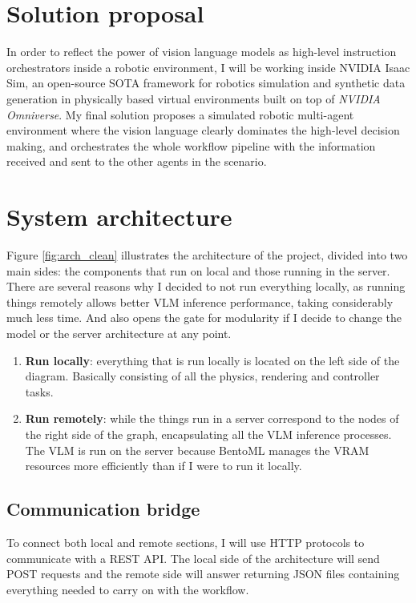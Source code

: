\section{Solution proposal}
In order to reflect the power of vision language models as high-level instruction orchestrators inside a robotic environment, I will be working inside NVIDIA Isaac Sim, an open-source SOTA framework for robotics simulation and synthetic data generation in physically based virtual environments built on top of \textit{NVIDIA Omniverse}. My final solution proposes a simulated robotic multi-agent environment where the vision language clearly dominates the high-level decision making, and orchestrates the whole workflow pipeline with the information received and sent to the other agents in the scenario. 

\section{System architecture}
Figure \ref{fig:arch_clean} illustrates the architecture of the project, divided into two main sides: the components that run on local and those running in the server. There are several reasons why I decided to not run everything locally, as running things remotely allows better VLM inference performance, taking considerably much less time. And also opens the gate for modularity if I decide to change the model or the server architecture at any point. 

\begin{enumerate}
	\item \textbf{Run locally}: everything that is run locally is located on the left side of the diagram. Basically consisting of all the physics, rendering and controller tasks.  
	
	\item \textbf{Run remotely}: while the things run in a server correspond to the nodes of the right side of the graph, encapsulating all the VLM inference processes. The VLM is run on the server because BentoML manages the VRAM resources more efficiently than if I were to run it locally.
\end{enumerate}

\subsection{Communication bridge}
To connect both local and remote sections, I will use HTTP protocols to communicate with a REST API. The local side of the architecture will send POST requests and the remote side will answer returning JSON files containing everything needed to carry on with the workflow. 

